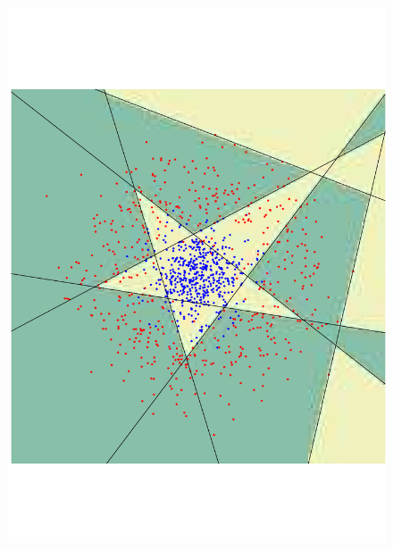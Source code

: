 \begin{figure}
\begin{center}
 \includegraphics[angle=270, scale=0.166]{ch4/figures/89.pdf}

\end{center}
\end{figure}
